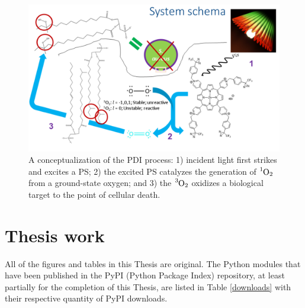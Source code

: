 \begin{figure}[h]
    \centering
    \includegraphics[width = \textwidth]{images/Introduction/PDI_workflow.png}
    \caption{
        A conceptualization of the PDI process: 1) incident light first strikes and excites a PS; 2) the excited PS catalyzes the generation of $\ce{^1O_2}$ from a ground-state oxygen; and 3) the $\ce{^3O_2}$ oxidizes a biological target to the point of cellular death.   
    }
    \label{PDI_workflow}
\end{figure}

\section{Thesis work}
All of the figures and tables in this Thesis are original. The Python modules that have been published in the PyPI (Python Package Index) repository, at least partially for the completion of this Thesis, are listed in Table \ref{downloads} with their respective quantity of PyPI downloads.

